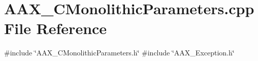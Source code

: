 \hypertarget{a00743}{}\section{A\+A\+X\+\_\+\+C\+Monolithic\+Parameters.\+cpp File Reference}
\label{a00743}
{\ttfamily \#include \char`\"{}A\+A\+X\+\_\+\+C\+Monolithic\+Parameters.\+h\char`\"{}}\newline
{\ttfamily \#include \char`\"{}A\+A\+X\+\_\+\+Exception.\+h\char`\"{}}\newline
